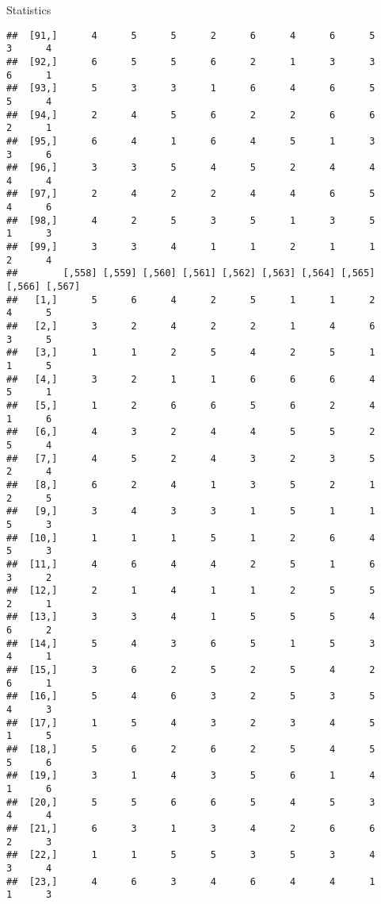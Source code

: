 \documentclass[
  ignorenonframetext,
]{beamer}
\begin{document}
\begin{frame}[fragile]{Statistics}
\begin{verbatim}
##  [91,]      4      5      5      2      6      4      6      5      3      4
##  [92,]      6      5      5      6      2      1      3      3      6      1
##  [93,]      5      3      3      1      6      4      6      5      5      4
##  [94,]      2      4      5      6      2      2      6      6      2      1
##  [95,]      6      4      1      6      4      5      1      3      3      6
##  [96,]      3      3      5      4      5      2      4      4      4      4
##  [97,]      2      4      2      2      4      4      6      5      4      6
##  [98,]      4      2      5      3      5      1      3      5      1      3
##  [99,]      3      3      4      1      1      2      1      1      2      4
##        [,558] [,559] [,560] [,561] [,562] [,563] [,564] [,565] [,566] [,567]
##   [1,]      5      6      4      2      5      1      1      2      4      5
##   [2,]      3      2      4      2      2      1      4      6      3      5
##   [3,]      1      1      2      5      4      2      5      1      1      5
##   [4,]      3      2      1      1      6      6      6      4      5      1
##   [5,]      1      2      6      6      5      6      2      4      1      6
##   [6,]      4      3      2      4      4      5      5      2      5      4
##   [7,]      4      5      2      4      3      2      3      5      2      4
##   [8,]      6      2      4      1      3      5      2      1      2      5
##   [9,]      3      4      3      3      1      5      1      1      5      3
##  [10,]      1      1      1      5      1      2      6      4      5      3
##  [11,]      4      6      4      4      2      5      1      6      3      2
##  [12,]      2      1      4      1      1      2      5      5      2      1
##  [13,]      3      3      4      1      5      5      5      4      6      2
##  [14,]      5      4      3      6      5      1      5      3      4      1
##  [15,]      3      6      2      5      2      5      4      2      6      1
##  [16,]      5      4      6      3      2      5      3      5      4      3
##  [17,]      1      5      4      3      2      3      4      5      1      5
##  [18,]      5      6      2      6      2      5      4      5      5      6
##  [19,]      3      1      4      3      5      6      1      4      1      6
##  [20,]      5      5      6      6      5      4      5      3      4      4
##  [21,]      6      3      1      3      4      2      6      6      2      3
##  [22,]      1      1      5      5      3      5      3      4      3      4
##  [23,]      4      6      3      4      6      4      4      1      1      3

\end{verbatim}
\end{frame}
\end{document}
